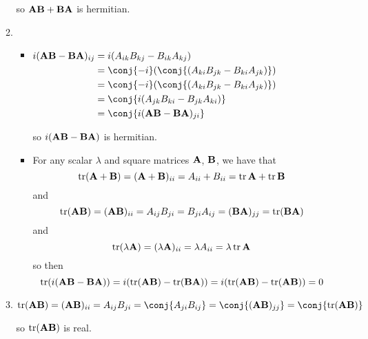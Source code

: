 \documentclass[fleqn,a4paper,11pt]{article}
\begin{document}
\begin{enumerate}[label=\textbf{\arabic*.}]
\begin{enumerate}[label=(\roman*)]
     so \(\mathbf{A}\mathbf{B} + \mathbf{B}\mathbf{A}\) is hermitian.
    \item
     \begin{itemize}
      \item \(
       \begin{aligned}[t]
        i(\mat A\mat B - \mat B\mat A)_{ij}
         &= i( A_{ik}  B_{kj} -  B_{ik}  A_{kj}) \\
         &= \conj{-i}(\conj{( A_{ki}  B_{jk}
           -  B_{ki}  A_{jk})}) \\
         &= \conj{-i}(\conj{( A_{ki}  B_{jk}
           -  B_{ki}  A_{jk})}) \\
         &= \conj{i( A_{jk}  B_{ki} -  B_{jk}  A_{ki})} \\
         &= \conj{i(\mat A\mat B - \mat B\mat A)_{ji}}
       \end{aligned}\)

       so \(i(\mathbf{A}\mathbf{B} - \mathbf{B}\mathbf{A})\) is hermitian.
      \item
       For any scalar \(\lambda\) and square matrices \(\mathbf{A}\), \(\mathbf{B}\), we
       have that
       \begin{equation*}
        \operatorname{tr}(\mathbf{A} + \mathbf{B})
         = (\mathbf{A} + \mathbf{B})_{ii}
         =  A_{ii} +  B_{ii}
         = \operatorname{tr}\mathbf{A} + \operatorname{tr}\mathbf{B}
       \end{equation*}
       and
       \begin{equation*}
        \operatorname{tr}(\mathbf{A}\mathbf{B})
        = (\mathbf{A}\mathbf{B})_{ii}
        =  A_{ij}  B_{ji}
        =  B_{ji}  A_{ij}
        = (\mathbf{B}\mathbf{A})_{jj}
         = \operatorname{tr}(\mathbf{B}\mathbf{A})
       \end{equation*}
       and
       \begin{equation*}
        \operatorname{tr}(\lambda \mathbf{A})
        = (\lambda \mathbf{A})_{ii}
        = \lambda  A_{ii}
        = \lambda \operatorname{tr}\mathbf{A}
       \end{equation*}
       so then
       \begin{equation*}
        \operatorname{tr}(i(\mathbf{A}\mathbf{B} - \mathbf{B}\mathbf{A}))
        = i(\operatorname{tr}(\mathbf{A}\mathbf{B}) - \operatorname{tr}(\mathbf{B}\mathbf{A}))
        = i(\operatorname{tr}(\mathbf{A}\mathbf{B}) - \operatorname{tr}(\mathbf{A}\mathbf{B})) = 0
       \end{equation*}
     \end{itemize}
    \item \(
      \tr(\mat A\mat B)
      = (\mat A\mat B)_{ii}
      =  A_{ij}  B_{ji}
      = \conj{ A_{ji}  B_{ij}}
      = \conj{(\mat A\mat B)_{jj}} = \conj{\tr(\mat A\mat B)}
      \)

      so \(\operatorname{tr}(\mathbf{A}\mathbf{B})\) is real.


\end{enumerate}
\end{enumerate}
\end{document}
